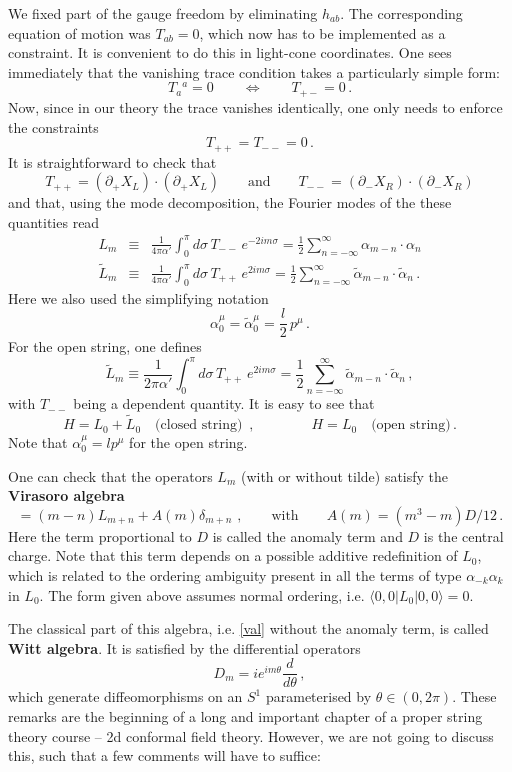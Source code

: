 \documentclass[12pt]{article}
\newcommand{\be}{\begin{equation}}
\newcommand{\ee}{\end{equation}}
\newcommand{\bea}{\begin{eqnarray}}
\newcommand{\eea}{\end{eqnarray}}
\numberwithin{equation}{section}
\begin{document}
We fixed part of the gauge freedom by eliminating $h_{ab}$. The corresponding equation of motion was $T_{ab}=0$, which now has to be implemented as a constraint. It is convenient to do this in light-cone coordinates. One sees immediately that the vanishing trace condition takes a particularly simple form:
\be
T_a{}^a=0\qquad\Leftrightarrow \qquad T_{+-}=0\,.
\ee
Now, since in our theory the trace vanishes identically, one only needs to enforce the constraints
\be
T_{++}=T_{--}=0\,.
\ee
It is straightforward to check that
\be
T_{++}=(\partial_+ X_L)\cdot (\partial_+ X_L)\qquad \mbox{and}\qquad T_{--}=(\partial_- X_R)\cdot (\partial_- X_R)
\ee
and that, using the mode decomposition, the Fourier modes of the these quantities read
\bea
L_m &\equiv& \frac{1}{4\pi\alpha'}\int_0^\pi d\sigma\,T_{--} \, e^{-2im\sigma} = \frac{1}{2} \sum_{n=-\infty}^\infty \alpha_{m-n}\cdot\alpha_n\label{odl}
\\
\tilde{L}_m &\equiv & \frac{1}{4\pi\alpha'}\int_0^\pi d\sigma\,T_{++} \, e^{2im\sigma} = \frac{1}{2} \sum_{n=-\infty}^\infty \tilde{\alpha}_{m-n}\cdot\tilde{\alpha}_n\,.
\eea
Here we also used the simplifying notation
\be
\alpha_0^\mu=\tilde{\alpha}_0^\mu=\frac{l}{2}\,p^\mu\,.
\ee
For the open string, one defines 
\be
\tilde{L}_m \equiv  \frac{1}{2\pi\alpha'}\int_0^\pi d\sigma\,T_{++} \, e^{2im\sigma} = \frac{1}{2} \sum_{n=-\infty}^\infty \tilde{\alpha}_{m-n}\cdot\tilde{\alpha}_n\,,
\ee
with $T_{--}$ being a dependent quantity. It is easy to see that
\be
H=L_0+\tilde{L}_0\quad\mbox{(closed string)}\,\,\,,\qquad \qquad
H=L_0\quad\mbox{(open string)}\,.
\ee
Note that $\alpha_0^\mu=lp^\mu$ for the open string.

One can check that the operators $L_m$ (with or without tilde) satisfy the {\bf Virasoro algebra}
\be
[L_m,L_n]=(m-n)L_{m+n}+A(m)\delta_{m+n}\,\,,\qquad\mbox{with}\qquad 
A(m)=(m^3-m)D/12\,.\label{val}
\ee
Here the term proportional to $D$ is called the anomaly term and $D$ is the central charge. Note that this term depends on a possible additive redefinition of $L_0$, which is related to the ordering ambiguity present in all the terms of type $\alpha_{-k}\alpha_k$ in $L_0$. The form given above assumes normal ordering, i.e. $\langle 0,0|L_0|0,0\rangle=0$. 

The classical part of this algebra, i.e. \eqref{val} without the anomaly term, is called {\bf Witt algebra}. It is satisfied by the differential operators 
\be 
D_m=ie^{im\theta}\frac{d}{d\theta}\,,
\ee
which generate diffeomorphisms on an $S^1$ parameterised by $\theta\in (0,2\pi)$. These remarks are the beginning of a long and important chapter of a proper string theory course -- 2d conformal field theory. However, we are not going to discuss this, such that a few comments will have to suffice:
\end{document}
